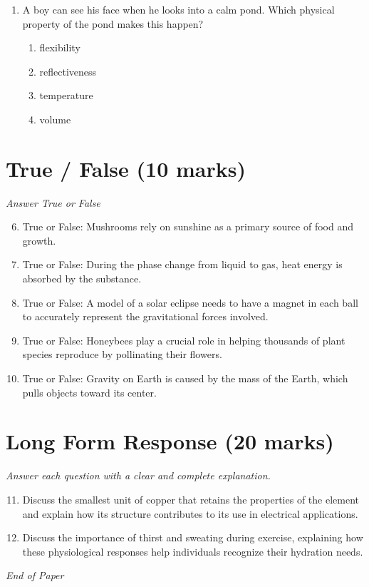 \documentclass[12pt]{article}
\begin{document}
\begin{enumerate}[label=\arabic*.]
\begin{enumerate}[label=(\alph*)]
    \item one that eats meat
    \item one that uses plants for shelter
    \item one that lives under the ground
    \item one that builds nests on the ground
\end{enumerate}
\item A boy can see his face when he looks into a calm pond. Which physical property of the pond makes this happen?
\begin{enumerate}[label=(\alph*)]
    \item flexibility
    \item reflectiveness
    \item temperature
    \item volume
\end{enumerate}
\end{enumerate}

\section*{True / False (10 marks)}
\textit{Answer True or False}
\begin{enumerate}[label=\arabic*.]
\setcounter{enumi}{5}
\item True or False: Mushrooms rely on sunshine as a primary source of food and growth.
\item True or False: During the phase change from liquid to gas, heat energy is absorbed by the substance.
\item True or False: A model of a solar eclipse needs to have a magnet in each ball to accurately represent the gravitational forces involved.
\item True or False: Honeybees play a crucial role in helping thousands of plant species reproduce by pollinating their flowers.
\item True or False: Gravity on Earth is caused by the mass of the Earth, which pulls objects toward its center.
\end{enumerate}

\section*{Long Form Response (20 marks)}
\textit{Answer each question with a clear and complete explanation.}
\begin{enumerate}[label=\arabic*.]
\setcounter{enumi}{10}
\item Discuss the smallest unit of copper that retains the properties of the element and explain how its structure contributes to its use in electrical applications.
\item Discuss the importance of thirst and sweating during exercise, explaining how these physiological responses help individuals recognize their hydration needs.
\end{enumerate}

\vfill
\noindent\textit{End of Paper}
\end{document}

